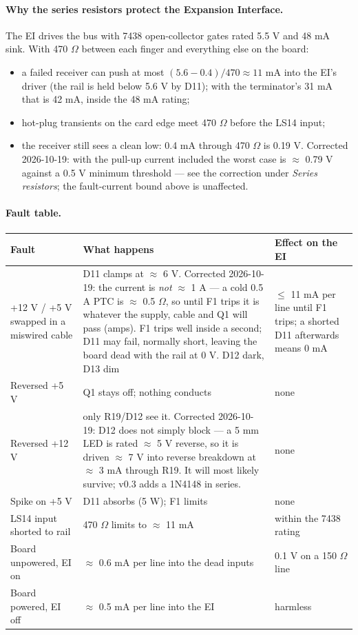 \documentclass[11pt,a4paper]{article}
\begin{document}
\paragraph{Why the series resistors protect the Expansion Interface.}
The EI drives the bus with 7438 open-collector gates rated 5.5 V and 48 mA sink. With 470 $\Omega$ between
each finger and everything else on the board:
\begin{itemize}[leftmargin=8mm]
\item a failed receiver can push at most $(5.6 - 0.4)/470 \approx 11$ mA into the EI's driver (the rail is held
below 5.6 V by D11); with the terminator's 31 mA that is 42 mA, inside the 48 mA rating;
\item hot-plug transients on the card edge meet 470 $\Omega$ before the LS14 input;
\item the receiver still sees a clean low: 0.4 mA through 470 $\Omega$ is 0.19 V. \textcolor{red!70!black}{Corrected 2026-10-19: with the pull-up current included the worst case is $\approx$ 0.79 V against a 0.5 V minimum threshold --- see the correction under \emph{Series resistors}; the fault-current bound above is unaffected.}
\end{itemize}

\paragraph{Fault table.}
\begin{center}
\begin{tabular}{@{}p{42mm}p{70mm}p{48mm}@{}}
\toprule
Fault & What happens & Effect on the EI\\
\midrule
+12 V / +5 V swapped in a miswired cable & D11 clamps at $\approx$ 6 V. \textcolor{red!70!black}{Corrected 2026-10-19: the current is \emph{not} $\approx$ 1 A --- a cold 0.5 A PTC is $\approx$ 0.5 $\Omega$, so until F1 trips it is whatever the supply, cable and Q1 will pass (amps). F1 trips well inside a second; D11 may fail, normally short, leaving the board dead with the rail at 0 V.} D12 dark, D13 dim & $\le$ 11 mA per line until F1 trips; a shorted D11 afterwards means 0 mA\\
Reversed +5 V & Q1 stays off; nothing conducts & none\\
Reversed +12 V & only R19/D12 see it. \textcolor{red!70!black}{Corrected 2026-10-19: D12 does not simply block --- a 5 mm LED is rated $\approx$ 5 V reverse, so it is driven $\approx$ 7 V into reverse breakdown at $\approx$ 3 mA through R19. It will most likely survive; v0.3 adds a 1N4148 in series.} & none\\
Spike on +5 V & D11 absorbs (5 W); F1 limits & none\\
LS14 input shorted to rail & 470 $\Omega$ limits to $\approx$ 11 mA & within the 7438 rating\\
Board unpowered, EI on & $\approx$ 0.6 mA per line into the dead inputs & 0.1 V on a 150 $\Omega$ line\\
Board powered, EI off & $\approx$ 0.5 mA per line into the EI & harmless\\
\bottomrule
\end{tabular}
\end{center}
\end{document}
